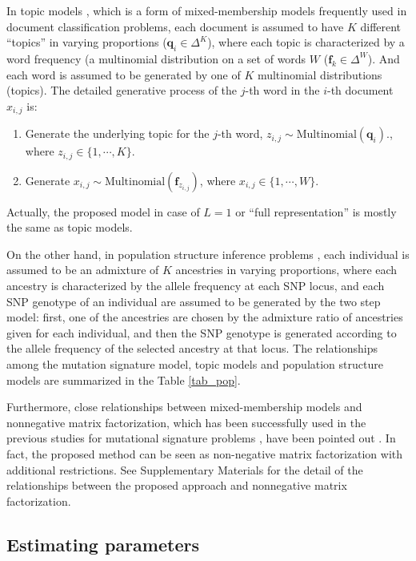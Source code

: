 In topic models \cite{Hofmann:1999,Blei:2003},
which is a form of mixed-membership models frequently used in document classification problems,
each document is assumed to have $K$ different ``topics'' in varying proportions ($\bm{q}_i \in \Delta^K$),
where each topic is characterized by a word frequency (a multinomial distribution on a set of words $W$ ($\bm{f}_k \in \Delta^W$).
And each word is assumed to be generated by one of $K$ multinomial distributions (topics).
The detailed generative process of the $j$-th word in the $i$-th document $x_{i,j}$ is:  
\begin{enumerate}
\item
Generate the underlying topic for the $j$-th word, $z_{i,j} \sim \text{Multinomial} (\bm{q}_i)$., where $z_{i,j} \in \{1,\cdots,K \}$.
\item
Generate $x_{i,j} \sim \text{Multinomial} (\bm{f}_{z_{i,j}})$, where $x_{i,j} \in \{1, \cdots, W \}$.
\end{enumerate}
Actually, the proposed model in case of $L = 1$ or ``full representation''  is mostly the same as topic models. 

On the other hand, in population structure inference problems \cite{pmid10835412, pmid19648217}, 
each individual is assumed to be an admixture of $K$ ancestries in varying proportions, 
where each ancestry is characterized by the allele frequency at each SNP locus,
and each SNP genotype of an individual are assumed to be generated by the two step model:
first, one of the ancestries are chosen by the admixture ratio of ancestries given for each individual,
and then the SNP genotype is generated according to the allele frequency of the selected ancestry at that locus.
The relationships among the mutation signature model, topic models and population structure models are summarized in the Table \ref{tab_pop}.



Furthermore, close relationships between mixed-membership models and nonnegative matrix factorization,
which has been successfully used in the previous studies for mutational signature problems \cite{pmid22608084, pmid23318258, pmid23945592},
have been pointed out \cite{ding2008equivalence}.
In fact, the proposed method can be seen as non-negative matrix factorization with additional restrictions.
See Supplementary Materials for the detail of the relationships between the proposed approach and nonnegative matrix factorization.



\subsection*{Estimating parameters}


